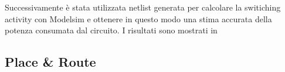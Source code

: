 Successivamente è stata utilizzata netlist generata per calcolare la switiching activity con Modelsim e ottenere in questo modo una stima accurata della potenza consumata dal circuito. I risultati sono mostrati in


\subsection{Place \& Route}
